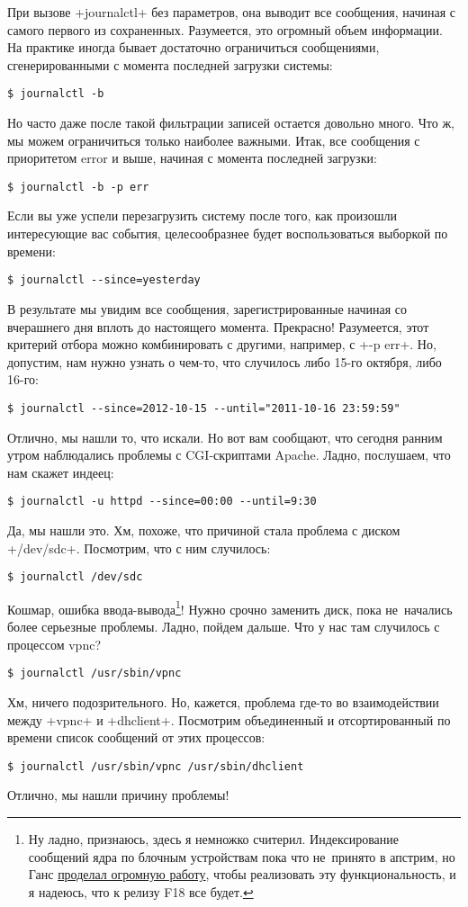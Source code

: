 \documentclass[10pt,oneside,a4paper]{article}
\begin{document}
При вызове +journalctl+ без параметров, она выводит все сообщения, начиная с
самого первого из сохраненных. Разумеется, это огромный объем информации. На
практике иногда бывает достаточно ограничиться сообщениями, сгенерированными с
момента последней загрузки системы:
\begin{Verbatim}
$ journalctl -b
\end{Verbatim}
Но часто даже после такой фильтрации записей остается довольно много. Что ж, мы
можем ограничиться только наиболее важными. Итак, все сообщения с приоритетом
error и выше, начиная с момента последней загрузки:
\begin{Verbatim}
$ journalctl -b -p err
\end{Verbatim}

Если вы уже успели перезагрузить систему после того, как произошли интересующие
вас события, целесообразнее будет воспользоваться выборкой по времени:
\begin{Verbatim}
$ journalctl --since=yesterday
\end{Verbatim}
В результате мы увидим все сообщения, зарегистрированные начиная со вчерашнего
дня вплоть до настоящего момента. Прекрасно! Разумеется, этот критерий отбора можно
комбинировать с другими, например, с +-p err+. Но, допустим, нам нужно узнать о
чем-то, что случилось либо 15-го октября, либо 16-го:
\begin{Verbatim}
$ journalctl --since=2012-10-15 --until="2011-10-16 23:59:59"
\end{Verbatim}
Отлично, мы нашли то, что искали. Но вот вам сообщают, что сегодня ранним утром
наблюдались проблемы с CGI-скриптами Apache. Ладно, послушаем, что нам скажет
индеец:
\begin{Verbatim}
$ journalctl -u httpd --since=00:00 --until=9:30
\end{Verbatim}
Да, мы нашли это. Хм, похоже, что причиной стала проблема с диском +/dev/sdc+.
Посмотрим, что с ним случилось:
\begin{Verbatim}
$ journalctl /dev/sdc
\end{Verbatim}
Кошмар, ошибка ввода-вывода\footnote{Ну ладно, признаюсь, здесь я немножко
считерил. Индексирование сообщений ядра по блочным устройствам пока что
не~принято в апстрим, но Ганс
\href{http://www.spinics.net/lists/linux-scsi/msg62499.html}{проделал огромную
работу}, чтобы реализовать эту функциональность, и я надеюсь, что к релизу F18
все будет.}! Нужно срочно заменить диск, пока не~начались более серьезные
проблемы. Ладно, пойдем дальше. Что у нас там случилось с процессом vpnc?
\begin{Verbatim}
$ journalctl /usr/sbin/vpnc
\end{Verbatim}
Хм, ничего подозрительного. Но, кажется, проблема где-то во взаимодействии между
+vpnc+ и +dhclient+. Посмотрим объединенный и отсортированный по времени список
сообщений от этих процессов:
\begin{Verbatim}
$ journalctl /usr/sbin/vpnc /usr/sbin/dhclient
\end{Verbatim}
Отлично, мы нашли причину проблемы!
\end{document}
